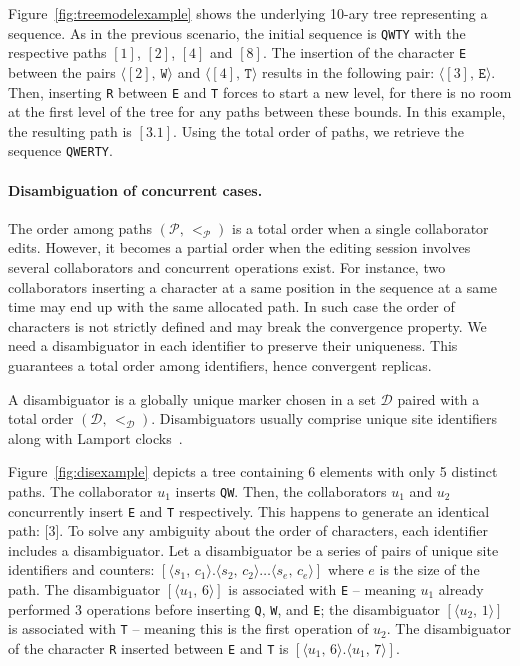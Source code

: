 Figure~\ref{fig:treemodelexample} shows the underlying 10-ary tree representing
a sequence. As in the previous scenario, the initial sequence is \texttt{QWTY}
with the respective paths $[1]$, $[2]$, $[4]$ and $[8]$. The insertion of the
character \texttt{E} between the pairs $\langle [2],\, \texttt{W}\rangle$ and
$\langle [4],\, \texttt{T}\rangle$ results in the following pair:
$\langle [3],\, \texttt{E} \rangle$. Then, inserting \texttt{R} between
\texttt{E} and \texttt{T} forces to start a new level, for there is no room at
the first level of the tree for any paths between these bounds. In this example,
the resulting path is $[3.1]$. Using the total order of paths, we retrieve the
sequence \texttt{QWERTY}.


\paragraph{Disambiguation of concurrent cases.}

The order among paths $(\mathcal{P},\,<_\mathcal{P})$ is a total order when a
single collaborator edits. However, it becomes a partial order when the editing
session involves several collaborators and concurrent operations exist. For
instance, two collaborators inserting a character at a same position in the
sequence at a same time may end up with the same allocated path. In such case
the order of characters is not strictly defined and may break the convergence
property. We need a disambiguator in each identifier to preserve their
uniqueness. This guarantees a total order among identifiers, hence convergent
replicas.

\begin{definition}[Disambiguator]
  A disambiguator is a globally unique marker chosen in a set $\mathcal{D}$
  paired with a total order $(\mathcal{D},\, <_\mathcal{D})$. Disambiguators
  usually comprise unique site identifiers along with Lamport
  clocks~\cite{lamport1978time}.
\end{definition}

Figure~\ref{fig:disexample} depicts a tree containing 6 elements with only 5
distinct paths. The collaborator $u_1$ inserts \texttt{QW}.  Then, the
collaborators $u_1$ and $u_2$ concurrently insert \texttt{E} and \texttt{T}
respectively. This happens to generate an identical path: [$3$]. To solve any
ambiguity about the order of characters, each identifier includes a
disambiguator.  Let a disambiguator be a series of pairs of unique site
identifiers and counters:
$[\langle s_1,\, c_1 \rangle.\langle s_2,\, c_2 \rangle \ldots \langle s_e,\,
c_e \rangle]$
where $e$ is the size of the path.  The disambiguator
$[\langle u_1,\, 6\rangle]$ is associated with \texttt{E} -- meaning $u_1$
already performed 3 operations before inserting \texttt{Q}, \texttt{W}, and
\texttt{E}; the disambiguator $[\langle u_2,\, 1\rangle]$ is associated with
\texttt{T} -- meaning this is the first operation of $u_2$. The disambiguator of
the character \texttt{R} inserted between \texttt{E} and \texttt{T} is
$[\langle u_1,\, 6\rangle.\langle u_1,\, 7\rangle]$.


